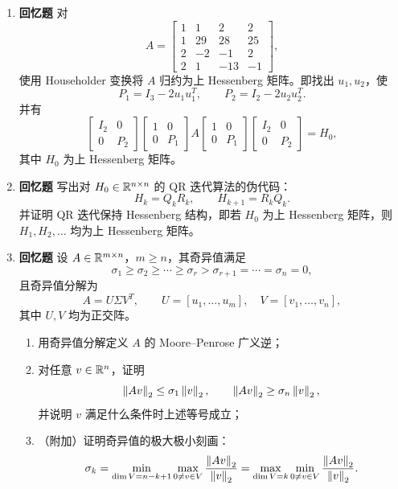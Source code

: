 \documentclass{article}
\newcommand{\oldtag}{\textcolor{red!65!black}{\textbf{回忆题}}}
\begin{document}
\begin{enumerate}
  \item \oldtag{} 对
  \[
    A=\begin{bmatrix}
      1&1&2&2\\
      1&29&28&25\\
      2&-2&-1&2\\
      2&1&-13&-1
    \end{bmatrix},
  \]
  使用 Householder 变换将 $A$ 归约为上 Hessenberg 矩阵。即找出 $u_1,u_2$，使
  \[
    P_1=I_3-2u_1u_1^T,\qquad P_2=I_2-2u_2u_2^T.
  \]
  并有
  \[
    \begin{bmatrix}I_2&0\\0&P_2\end{bmatrix}
    \begin{bmatrix}1&0\\0&P_1\end{bmatrix}
    A
    \begin{bmatrix}1&0\\0&P_1\end{bmatrix}
    \begin{bmatrix}I_2&0\\0&P_2\end{bmatrix}
    =H_0,
  \]
  其中 $H_0$ 为上 Hessenberg 矩阵。

  \item \oldtag{} 写出对 $H_0\in\mathbb{R}^{n\times n}$ 的 QR 迭代算法的伪代码：
  \[
    H_k=Q_kR_k,\qquad H_{k+1}=R_kQ_k.
  \]
  并证明 QR 迭代保持 Hessenberg 结构，即若 $H_0$ 为上 Hessenberg 矩阵，则
  $H_1,H_2,\dots$ 均为上 Hessenberg 矩阵。

  \item \oldtag{} 设 $A\in\mathbb{R}^{m\times n}$，$m\ge n$，其奇异值满足
  \[
    \sigma_1\ge\sigma_2\ge\cdots\ge\sigma_r>
    \sigma_{r+1}=\cdots=\sigma_n=0,
  \]
  且奇异值分解为
  \[
    A=U\Sigma V^T,\qquad
    U=[u_1,\dots,u_m],\quad V=[v_1,\dots,v_n],
  \]
  其中 $U,V$ 均为正交阵。
  \begin{enumerate}[(1)]
    \item 用奇异值分解定义 $A$ 的 Moore--Penrose 广义逆；
    \item 对任意 $v\in\mathbb{R}^n$，证明
    \[
      \left\| Av \right\|_2\le\sigma_1\left\| v \right\|_2,\qquad
      \left\| Av \right\|_2\ge\sigma_n\left\| v \right\|_2,
    \]
    并说明 $v$ 满足什么条件时上述等号成立；
    \item （附加）证明奇异值的极大极小刻画：
    \[
      \sigma_k=\min_{\dim V=n-k+1}\max_{0\ne v\in V}\frac{\left\| Av \right\|_2}{\left\| v \right\|_2}
      =
      \max_{\dim V=k}\min_{0\ne v\in V}\frac{\left\| Av \right\|_2}{\left\| v \right\|_2}.
    \]
  \end{enumerate}
\end{enumerate}
\end{document}
